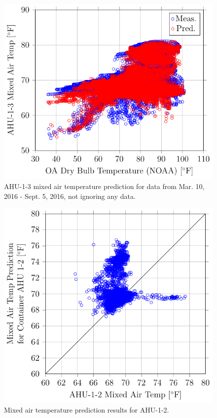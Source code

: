 \begin{figure}
\centering
\includegraphics[]{Plots/2016-09-07-0943-AHU13MixedAirTempvsOADryBulbTemperatureNOAA.pdf}
\caption{AHU-1-3 mixed air temperature prediction for data from Mar. 10, 2016 - Sept. 5, 2016, not ignoring any data.}
\label{fig:AHU13MixedAirTempvsOADryBulbTemperatureNOAA-2}
\end{figure}




\newcommand{\mixAirCaptionTwo}[1]{Mixed air temperature prediction results for #1.}

\begin{figure}
\centering
\includegraphics[]{Plots/2016-09-07-1335-MixedAirTempPredictionforContainerAHU12vsAHU12MixedAirTemp.pdf}
\caption{\mixAirCaptionTwo{AHU-1-2}}
\label{fig:2016-09-07-1335-MixedAirTempPredictionforContainerAHU12vsAHU12MixedAirTemp}
\end{figure}

